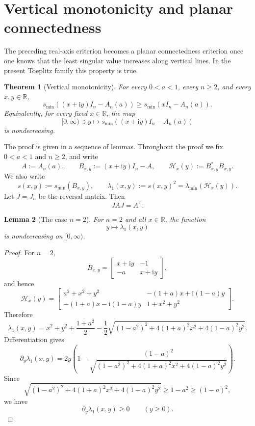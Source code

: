 \documentclass[11pt]{amsart}
\numberwithin{equation}{section}
\newcommand{\R}{\mathbb R}
\newcommand{\ii}{\mathrm i}
\newtheorem{theorem}{Theorem}[section]
\newtheorem{lemma}[theorem]{Lemma}
\begin{document}
\section{Vertical monotonicity and planar connectedness}
\label{sec:vertical-planar}

The preceding real-axis criterion becomes a planar connectedness criterion once one knows that the least singular value increases along vertical lines.  In the present Toeplitz family this property is true.

\begin{theorem}[Vertical monotonicity]\label{thm:vertical}
For every \(0<a<1\), every \(n\ge2\), and every \(x,y\in\R\),
\[
s_{\min}((x+\ii y)I_n-A_n(a))
\ge
s_{\min}(xI_n-A_n(a)).
\]
Equivalently, for every fixed \(x\in\R\), the map
\[
[0,\infty)\ni y
\longmapsto
s_{\min}((x+\ii y)I_n-A_n(a))
\]
is nondecreasing.
\end{theorem}

The proof is given in a sequence of lemmas.  Throughout the proof we fix \(0<a<1\) and \(n\ge2\), and write
\[
A:=A_n(a),
\qquad
B_{x,y}:=(x+\ii y)I_n-A,
\qquad
\mathcal H_x(y):=B_{x,y}^*B_{x,y}.
\]
We also write
\[
s(x,y):=s_{\min}(B_{x,y}),
\qquad
\lambda_1(x,y):=s(x,y)^2
=
\lambda_{\min}(\mathcal H_x(y)).
\]
Let \(J=J_n\) be the reversal matrix.  Then
\[
JAJ=A^{\mathsf T}.
\]

\begin{lemma}[The case \(n=2\)]\label{lem:vertical-n2}
For \(n=2\) and all \(x\in\R\), the function
\[
y\longmapsto \lambda_1(x,y)
\]
is nondecreasing on \([0,\infty)\).
\end{lemma}

\begin{proof}
For \(n=2\),
\[
B_{x,y}
=
\begin{bmatrix}
x+\ii y & -1\\
-a & x+\ii y
\end{bmatrix},
\]
and hence
\[
\mathcal H_x(y)
=
\begin{bmatrix}
a^2+x^2+y^2 & -(1+a)x+\ii(1-a)y\\
-(1+a)x-\ii(1-a)y & 1+x^2+y^2
\end{bmatrix}.
\]
Therefore
\[
\lambda_1(x,y)
=
x^2+y^2+\frac{1+a^2}{2}
-
\frac12
\sqrt{(1-a^2)^2+4(1+a)^2x^2+4(1-a)^2y^2}.
\]
Differentiation gives
\[
\partial_y\lambda_1(x,y)
=
2y
\left(
1-
\frac{(1-a)^2}
{\sqrt{(1-a^2)^2+4(1+a)^2x^2+4(1-a)^2y^2}}
\right).
\]
Since
\[
\sqrt{(1-a^2)^2+4(1+a)^2x^2+4(1-a)^2y^2}
\ge
1-a^2
\ge
(1-a)^2,
\]
we have
\[
\partial_y\lambda_1(x,y)\ge0
\qquad(y\ge0).
\]
\end{proof}
\end{document}
